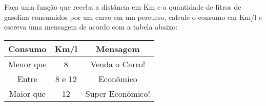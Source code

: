 
\question[10]

Faça uma função que receba a distância em Km e a quantidade de litros de gasolina consumidos por um carro em um percurso, calcule o consumo em Km/l e escreva uma mensagem de acordo com a tabela abaixo:

\begin{table}[h!]
	\centering
	\begin{tabular}{|c|c|c|}
		\hline 
		\textbf{Consumo} & \textbf{Km/l} & \textbf{Mensagem} \\ 
		\hline 
		Menor que & 8 & Venda o Carro! \\ 
		\hline 
		Entre & 8 e 12 & Econômico \\ 
		\hline 
		Maior que & 12 & Super Econômico! \\ 
		\hline 
	\end{tabular} 
\end{table}
